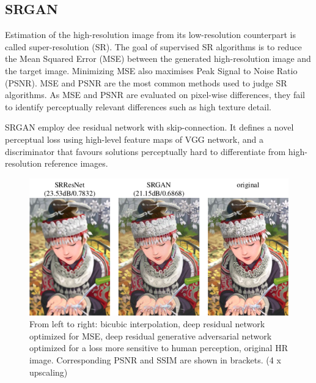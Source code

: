 \begin{onehalfspace}
    \section{SRGAN}
    Estimation of the high-resolution image from its low-resolution counterpart 
    is called super-resolution (SR). The goal of supervised SR algorithms is to 
    reduce the Mean Squared Error (MSE) between the generated high-resolution 
    image and the target image. Minimizing  MSE also maximises Peak Signal to 
    Noise Ratio (PSNR). MSE and PSNR are the most common methods used to judge 
    SR algorithms. 
    As MSE and PSNR are evaluated on pixel-wise differences, they fail to 
    identify perceptually relevant differences such as high texture detail. 

    SRGAN \cite{srgan} employ dee residual network with skip-connection. It defines a novel 
    perceptual loss using high-level feature maps of VGG network, and a 
    discriminator that favours solutions perceptually hard to differentiate 
    from high-resolution reference images.

    \begin{figure}[h]
        \centering
        \includegraphics[width=0.9\linewidth]{images/srgan.png}
        \caption{From left to right: bicubic interpolation, deep residual 
        network optimized for MSE, deep residual generative adversarial network 
        optimized for a loss more sensitive to human perception, original 
        HR image. Corresponding PSNR and SSIM are shown in brackets. 
        (4 x upscaling) \cite{srgan}}
    \end{figure} 
    
\end{onehalfspace}